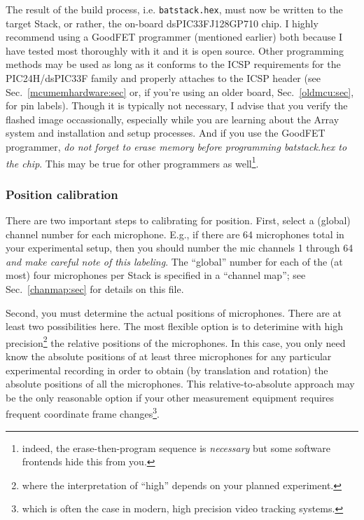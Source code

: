 \documentclass[letterpaper]{article}
\begin{document}
The result of the build process, i.e. \texttt{batstack.hex}, must now
be written to the target Stack, or rather, the on-board
dsPIC33FJ128GP710 chip. I highly recommend using a GoodFET programmer
(mentioned earlier) both because I have tested most thoroughly with it
and it is open source.  Other programming methods may be used as long
as it conforms to the ICSP requirements for the PIC24H/dsPIC33F family
and properly attaches to the ICSP header (see
Sec.~\ref{mcumemhardware:sec} or, if you're using an older board,
Sec.~\ref{oldmcu:sec}, for pin labels). Though it is typically not
necessary, I advise that you verify the flashed image occassionally,
especially while you are learning about the Array system and
installation and setup processes. And if you use the GoodFET
programmer, \textit{do not forget to erase memory before programming
  batstack.hex to the chip}. This may be true for other programmers as
well\footnote{indeed, the erase-then-program sequence is
  \textit{necessary} but some software frontends hide this from
  you.}.


\subsubsection{Position calibration}

There are two important steps to calibrating for position. First,
select a (global) channel number for each microphone. E.g., if there
are 64 microphones total in your experimental setup, then you should
number the mic channels 1 through 64 \textit{and make careful note of
  this labeling}. The ``global'' number for each of the (at most) four
microphones per Stack is specified in a ``channel map''; see
Sec.~\ref{chanmap:sec} for details on this file.

Second, you must determine the actual positions of microphones. There
are at least two possibilities here. The most flexible option is to
deterimine with high precision\footnote{where the interpretation of
  ``high'' depends on your planned experiment.} the relative positions
of the microphones. In this case, you only need know the absolute
positions of at least three microphones for any particular
experimental recording in order to obtain (by translation and
rotation) the absolute positions of all the microphones. This
relative-to-absolute approach may be the only reasonable option if
your other measurement equipment requires frequent coordinate frame
changes\footnote{which is often the case in modern, high precision
  video tracking systems.}.
\end{document}
